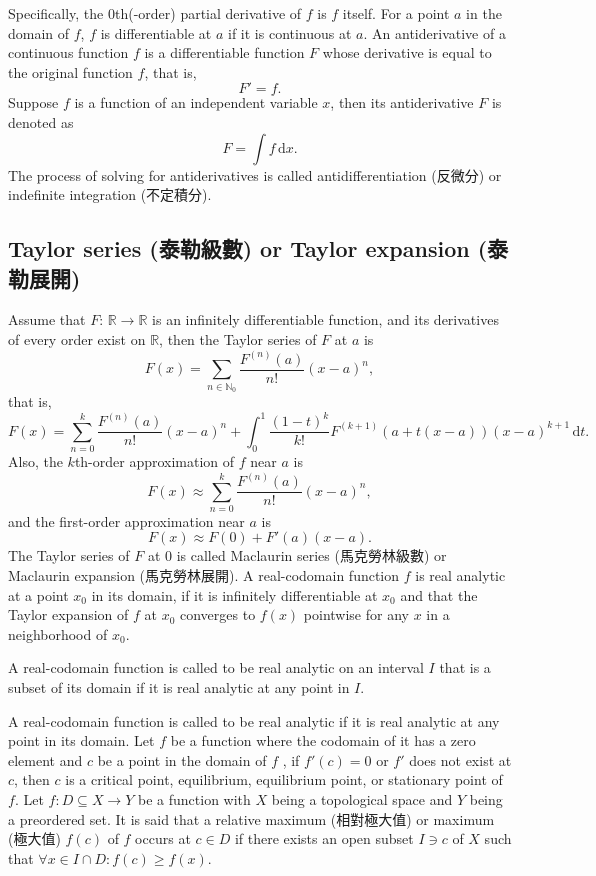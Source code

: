 \documentclass[a4paper,12pt]{report}
\begin{document}
Specifically, the $0$th(-order) partial derivative of $f$ is $f$ itself.
For a point $a$ in the domain of $f$, $f$ is differentiable at $a$ if it is continuous at $a$.
An antiderivative of a continuous function $f$ is a differentiable function $F$ whose derivative is equal to the original function $f$, that is,
\[F'=f.\]
Suppose $f$ is a function of an independent variable $x$, then its antiderivative $F$ is denoted as
\[F=\int f\,\mathrm{d}x.\]
The process of solving for antiderivatives is called antidifferentiation (反微分) or indefinite integration (不定積分).
\subsection{Taylor series (泰勒級數) or Taylor expansion (泰勒展開)}
Assume that $F:\,\mathbb{R}\to\mathbb{R}$ is an infinitely differentiable function, and its derivatives of every order exist on $\mathbb{R}$, then the Taylor series of $F$ at $a$ is
\[F(x) = \sum_{n\in\mathbb{N}_0} \frac{F^{(n)}(a)}{n!}(x-a)^n,\]
that is,
\[F(x) = \sum^k_{n=0} \frac{F^{(n)}(a)}{n!}(x-a)^n+\int_0^1\frac{(1-t)^k}{k!}F^{(k+1)}(a+t(x-a))(x-a)^{k+1}\,\mathrm{d}t.\]
Also, the $k$th-order approximation of $f$ near $a$ is
\[F(x) \approx \sum^k_{n=0} \frac{F^{(n)}(a)}{n!}(x-a)^n,\]
and the first-order approximation near $a$ is
\[F(x) \approx F(0)+F'(a)(x-a).\]
The Taylor series of $F$ at $0$ is called Maclaurin series (馬克勞林級數) or Maclaurin expansion (馬克勞林展開).
A real-codomain function $f$ is real analytic at a point $x_0$ in its domain, if it is infinitely differentiable at $x_0$ and that the Taylor expansion of $f$ at $x_0$ converges to $f(x)$ pointwise for any $x$ in a neighborhood of $x_0$.

A real-codomain function is called to be real analytic on an interval $I$ that is a subset of its domain if it is real analytic at any point in $I$.

A real-codomain function is called to be real analytic if it is real analytic at any point in its domain.
Let $f$ be a function where the codomain of it has a zero element and \( c \) be a point in the domain of $f$ , if \( f'(c) = 0 \) or \( f' \) does not exist at \( c \), then \( c \) is a critical point, equilibrium, equilibrium point, or stationary point of \( f \).
Let $f\colon D\subseteq X\to Y$ be a function with $X$ being a topological space and $Y$ being a preordered set. It is said that a relative maximum (相對極大值) or maximum (極大值) \( f(c) \) of \(f\) occurs at $c\in D$ if there exists an open subset $I\ni c$ of $X$ such that \( \forall x\in I\cap D\colon f(c) \geq f(x) \).
\end{document}
